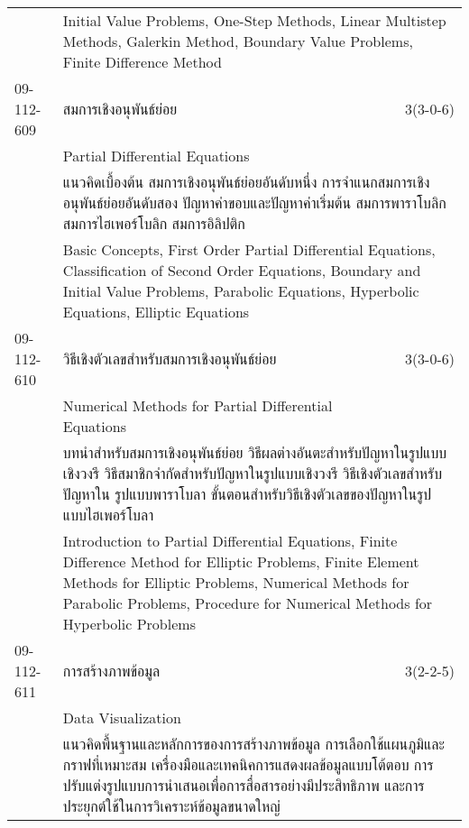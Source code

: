 \begin{longtable}{p{}p{}r{}}
&  \multicolumn{2}{p{0.75\textwidth}}{Initial Value Problems, One-Step Methods, Linear Multistep Methods, Galerkin Method, Boundary Value Problems, Finite Difference Method} \vspace{8mm} \\*
09-112-609 & สมการเชิงอนุพันธ์ย่อย & 3(3-0-6)\\*
 & Partial Differential Equations & \phantom{x} \vspace{3mm} \\*
&  \multicolumn{2}{p{0.75\textwidth}}{แนวคิดเบื้องต้น สมการเชิงอนุพันธ์ย่อยอันดับหนึ่ง การจำแนกสมการเชิงอนุพันธ์ย่อยอันดับสอง ปัญหาค่าขอบและปัญหาค่าเริ่มต้น สมการพาราโบลิก สมการไฮเพอร์โบลิก สมการอิลิปติก} \vspace{3mm} \\*
&  \multicolumn{2}{p{0.75\textwidth}}{Basic Concepts, First Order Partial Differential Equations, Classification of Second Order Equations, Boundary and Initial Value Problems, Parabolic Equations, Hyperbolic Equations, Elliptic Equations} \vspace{8mm} \\*
09-112-610 & วิธีเชิงตัวเลขสำหรับสมการเชิงอนุพันธ์ย่อย & 3(3-0-6)\\*
 & Numerical Methods for Partial Differential Equations & \phantom{x} \vspace{3mm} \\*
&  \multicolumn{2}{p{0.75\textwidth}}{บทนำสำหรับสมการเชิงอนุพันธ์ย่อย วิธีผลต่างอันตะสำหรับปัญหาในรูปแบบเชิงวงรี วิธีสมาชิกจำกัดสำหรับปัญหาในรูปแบบเชิงวงรี วิธีเชิงตัวเลขสำหรับปัญหาใน รูปแบบพาราโบลา ขั้นตอนสำหรับวิธีเชิงตัวเลขของปัญหาในรูปแบบไฮเพอร์โบลา} \vspace{3mm} \\*
&  \multicolumn{2}{p{0.75\textwidth}}{Introduction to Partial Differential Equations, Finite Difference Method for Elliptic Problems, Finite Element Methods for Elliptic Problems, Numerical Methods for Parabolic Problems, Procedure for Numerical Methods for Hyperbolic Problems} \vspace{8mm} \\*
09-112-611 & การสร้างภาพข้อมูล & 3(2-2-5)\\*
 & Data Visualization & \phantom{x} \vspace{3mm} \\*
&  \multicolumn{2}{p{0.75\textwidth}}{แนวคิดพื้นฐานและหลักการของการสร้างภาพข้อมูล การเลือกใช้แผนภูมิและกราฟที่เหมาะสม เครื่องมือและเทคนิคการแสดงผลข้อมูลแบบโต้ตอบ การปรับแต่งรูปแบบการนำเสนอเพื่อการสื่อสารอย่างมีประสิทธิภาพ และการประยุกต์ใช้ในการวิเคราะห์ข้อมูลขนาดใหญ่} \vspace{3mm} \\*

\end{longtable}
